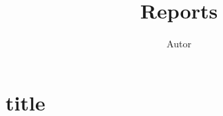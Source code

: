 \documentclass{ltjsarticle}
\begin{document}
\title{Reports}
\author{Autor}
\maketitle

\section{title}
\end{document}
